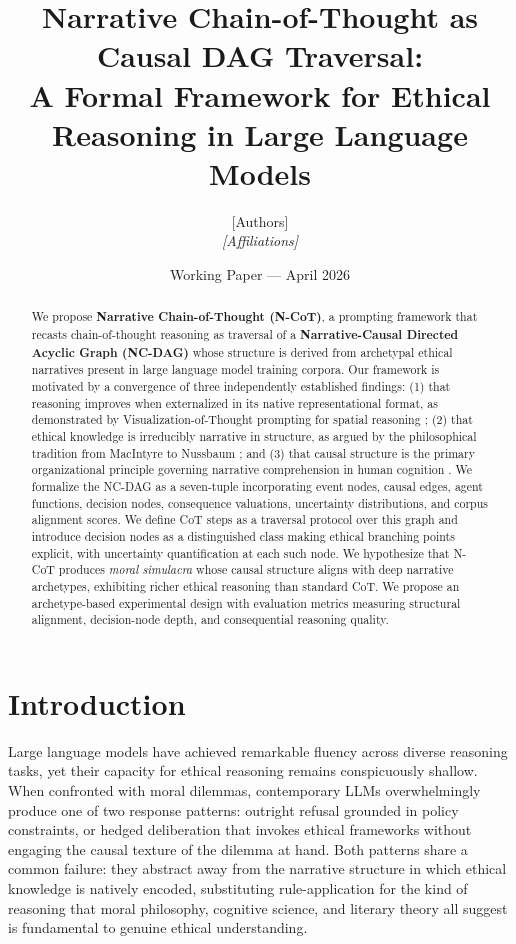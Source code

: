 \documentclass[11pt,letterpaper]{article}
\title{\vspace{-2em}\textbf{Narrative Chain-of-Thought as Causal DAG Traversal:}\\[0.3em]
\large A Formal Framework for Ethical Reasoning in Large Language Models}
\author{[Authors]\\\textit{[Affiliations]}}
\date{Working Paper --- April 2026}
\theoremstyle{defn}
\begin{document}
\maketitle

\begin{abstract}
\noindent
We propose \textbf{Narrative Chain-of-Thought (N-CoT)}, a prompting framework that recasts chain-of-thought reasoning as traversal of a \textbf{Narrative-Causal Directed Acyclic Graph (NC-DAG)} whose structure is derived from archetypal ethical narratives present in large language model training corpora. Our framework is motivated by a convergence of three independently established findings: (1) that reasoning improves when externalized in its native representational format, as demonstrated by Visualization-of-Thought prompting for spatial reasoning \citep{wu2024mindseye}; (2) that ethical knowledge is irreducibly narrative in structure, as argued by the philosophical tradition from MacIntyre \citeyearpar{macintyre1981,macintyre2016} to Nussbaum \citeyearpar{nussbaum1990,nussbaum1997}; and (3) that causal structure is the primary organizational principle governing narrative comprehension in human cognition \citep{trabasso1985causal,chen2024causal}. We formalize the NC-DAG as a seven-tuple incorporating event nodes, causal edges, agent functions, decision nodes, consequence valuations, uncertainty distributions, and corpus alignment scores. We define CoT steps as a traversal protocol over this graph and introduce decision nodes as a distinguished class making ethical branching points explicit, with uncertainty quantification at each such node. We hypothesize that N-CoT produces \textit{moral simulacra} whose causal structure aligns with deep narrative archetypes, exhibiting richer ethical reasoning than standard CoT. We propose an archetype-based experimental design with evaluation metrics measuring structural alignment, decision-node depth, and consequential reasoning quality.
\end{abstract}

\section{Introduction}

Large language models have achieved remarkable fluency across diverse reasoning tasks, yet their capacity for ethical reasoning remains conspicuously shallow. When confronted with moral dilemmas, contemporary LLMs overwhelmingly produce one of two response patterns: outright refusal grounded in policy constraints, or hedged deliberation that invokes ethical frameworks without engaging the causal texture of the dilemma at hand. Both patterns share a common failure: they abstract away from the narrative structure in which ethical knowledge is natively encoded, substituting rule-application for the kind of reasoning that moral philosophy, cognitive science, and literary theory all suggest is fundamental to genuine ethical understanding.
\end{document}
